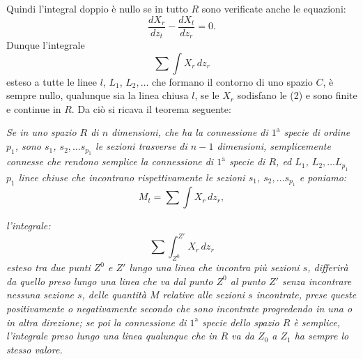 \documentclass{article}
\begin{document}
Quindi l'integral doppio è nullo se in tutto $R$ sono verificate anche le equazioni:
\[ \frac{dX_{r}}{dz_{t}} - \frac{dX_{t}}{dz_{r}} = 0. \tag{2} \]
Dunque l'integrale
\[ \sum \int X_{r}\,dz_{r} \]
esteso a tutte le linee $l$, $L_{1}$, $L_{2},\ldots$ che formano il contorno di uno spazio $C$, è sempre nullo, qualunque sia la linea chiusa $l$, se le $X_{r}$ sodisfano le (2) e sono finite e continue in $R$. Da ciò si ricava il teorema seguente:

\emph{Se in uno spazio $R$ di $n$ dimensioni, che ha la connessione di $1^{\text{a}}$ specie di ordine $p_{1}$, sono $s_{1}$, $s_{2},\ldots s_{p_{1}}$ le sezioni trasverse di $n-1$ dimensioni, semplicemente connesse che rendono semplice la connessione di $1^{\text{a}}$ specie di $R$, ed $L_{1}$, $L_{2},\ldots L_{p_{1}}$ $p_{1}$ linee chiuse che incontrano rispettivamente le sezioni $s_{1}$, $s_{2},\ldots s_{p_{1}}$ e poniamo:}
\[ M_{t} = \sum \int X_{r}\,dz_{r}, \]

\emph{l'integrale:}
\[ \sum \int_{Z^{0}}^{Z'} X_{r}\,dz_{r} \]
\emph{esteso tra due punti $Z^{0}$ e $Z'$ lungo una linea che incontra più sezioni $s$, differirà da quello preso lungo una linea che va dal punto $Z^{0}$ al punto $Z'$ senza incontrare nessuna sezione $s$, delle quantità $M$ relative alle sezioni $s$ incontrate, prese queste positivamente o negativamente secondo che sono incontrate progredendo in una o in altra direzione; se poi la connessione di $1^{\text{a}}$ specie dello spazio $R$ è semplice, l'integrale preso lungo una linea qualunque che in $R$ va da $Z_{0}$ a $Z_{1}$ ha sempre lo stesso valore.}
\end{document}

